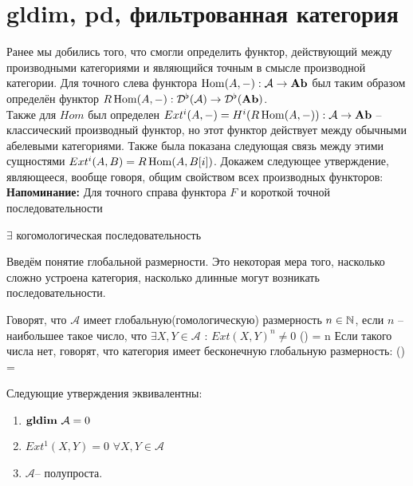 \documentclass[../main.tex]{subfiles}
\begin{document}
\section{gldim, pd, фильтрованная категория}
Ранее мы добились того, что смогли определить функтор, действующий между производными категориями и являющийся точным в смысле производной категории. 
Для точного слева функтора $\operatorname{Hom}(A, -) : \mathcal{A} \rightarrow \mathbf{Ab}$ был таким образом определён функтор $R\operatorname{Hom}(A, -) : \mathcal{D^\flat (A)} \rightarrow \mathcal{D^\flat (\mathbf{Ab})}$.\\
Также для $Hom$ был определен $Ext^i(A, -) = H^i(R\operatorname{Hom}(A, -)) : \mathcal{A} \rightarrow \mathbf{Ab}$ -- классический производный функтор, но этот функтор действует между обычными абелевыми категориями. Также была показана следующая связь между этими сущностями $Ext^i(A, B) = R\operatorname{Hom}(A, B[i])$.
Докажем следующее утверждение, являющееся, вообще говоря, общим свойством всех производных функторов:\\
\textbf{Напоминание:} Для точного справа функтора $F$ и короткой точной последовательности  $\exists$ когомологическая последовательность 
Введём понятие глобальной размерности. Это некоторая мера того, насколько сложно устроена категория, насколько длинные могут возникать последовательности.
\begin{to_def}
\label{gld}
Говорят, что $\mathcal{A}$ имеет глобальную(гомологическую) размерность $n\in \mathbb{N}$, если $n$ -- наибольшее такое число, что $\exists X, Y \in \mathcal{A}$ : $Ext(X, Y)^n \neq 0$
\bee
{}() = n
\eee
Если такого числа нет, говорят, что категория имеет бесконечную глобальную размерность:
\bee
{}() = \infty
\eee
\end{to_def}
\begin{to_thr}
Следующие утверждения эквивалентны:
\begin{enumerate}
    \item $\mathbf{gldim}\text{ } \mathcal{A} = 0$
    \item $Ext^1(X, Y) = 0$  $\forall X, Y \in \mathcal{A}$
    \item $\mathcal{A}$-- полупроста.
\end{enumerate}
\end{to_thr}
\end{document}
